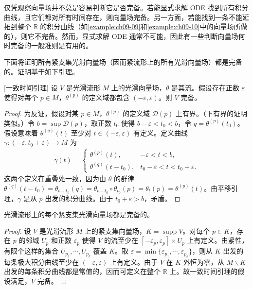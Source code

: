 \documentclass[../../main.tex]{subfiles}
\begin{document}
仅凭观察向量场并不总是容易判断它是否完备。若能显式求解 ODE 找到所有积分曲线，且它们都对所有时间存在，则向量场完备。另一方面，若能找到一条不能延拓到整个 $\mathbb{R}$ 的积分曲线（如\cref{example:ch09-09}和\cref{example:ch09-10}中的向量场所做的），则它不完备。然而，显式求解 ODE 通常不可能，因此有一些判断向量场何时完备的一般准则是有用的。

下面将证明所有紧支集光滑向量场（因而紧流形上的所有光滑向量场）都是完备的。证明基于如下引理。

\begin{lemma}\label{lemma:ch09-15}[一致时间引理]
设 $V$ 是光滑流形 $M$ 上的光滑向量场，$\theta$ 是其流。假设存在正数 $\varepsilon$ 使得对每个 $p\in M$，$\theta^{(p)}$ 的定义域都包含 $(-\varepsilon,\varepsilon)$。则 $V$ 完备。
\end{lemma}

\begin{proof}
为反证，假设对某 $p\in M$，$\theta^{(p)}$ 的定义域 $\mathscr{D}(p)$ 上有界。（下有界的证明类似。）令 $b=\sup\mathscr{D}(p)$，取正数 $t_0$ 使得 $b-\varepsilon<t_0<b$，令 $q=\theta^{(p)}(t_0)$。假设意味着 $\theta^{(q)}(t)$ 至少对 $t\in(-\varepsilon,\varepsilon)$ 有定义。定义曲线 $\gamma\colon(-\varepsilon,t_0+\varepsilon)\to M$ 为
\begin{align*}
\gamma(t)=
\begin{cases}
\theta^{(p)}(t), & -\varepsilon<t<b,\\
\theta^{(q)}(t-t_0), & t_0-\varepsilon<t<t_0+\varepsilon.
\end{cases}
\end{align*}
这两个定义在重叠处一致，因为由 $\theta$ 的群律 $\theta^{(q)}(t-t_0)=\theta_{t-t_0}(q)=\theta_{t-t_0}\circ\theta_{t_0}(p)=\theta_t(p)=\theta^{(p)}(t)$。由平移引理，$\gamma$ 是从 $p$ 出发的积分曲线。由于 $t_0+\varepsilon>b$，矛盾。
\end{proof}

\begin{theorem}\label{theorem:ch09-16}
光滑流形上的每个紧支集光滑向量场都是完备的。
\end{theorem}

\begin{proof}
设 $V$ 是光滑流形 $M$ 上的紧支集向量场，$K=\operatorname{supp}V$。对每个 $p\in K$，存在 $p$ 的邻域 $U_p$ 和正数 $\varepsilon_p$ 使得 $V$ 的流至少在 $[-\varepsilon_p,\varepsilon_p]\times U_p$ 上有定义。由紧性，有限个这样的集合 $U_{p_1},\cdots ,U_{p_k}$ 覆盖 $K$。取 $\varepsilon=\min\{\varepsilon_{p_1},\cdots ,\varepsilon_{p_k}\}$，则从 $K$ 出发的每条极大积分曲线至少在 $(-\varepsilon,\varepsilon)$ 上有定义。由于 $V$ 在 $K$ 外恒为零，从 $M\smallsetminus K$ 出发的每条积分曲线都是常值的，因而可定义在整个 $\mathbb{R}$ 上。故一致时间引理的假设满足，$V$ 完备。
\end{proof}
\end{document}
